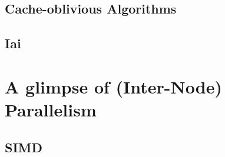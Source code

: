 \subsection{Cache-oblivious Algorithms}
\subsection{Iai}
\section{A glimpse of (Inter-Node) Parallelism}
\subsection{SIMD}
